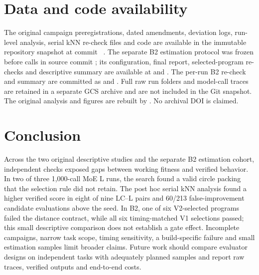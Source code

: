 \documentclass[11pt]{article}
\begin{document}
\section{Data and code availability}\label{sec:availability}

The original campaign preregistrations, dated amendments, deviation logs, run-level analysis, serial kNN re-check files and code are available in the immutable repository snapshot at commit ~\citep{pylypenko2026artifacts}. The separate B2 estimation protocol was frozen before calls in source commit ; its configuration, final report, selected-program re-checks and descriptive summary are available at  and . The per-run B2 re-check and summary are committed as  and . Full raw run folders and model-call traces are retained in a separate GCS archive and are not included in the Git snapshot. The original analysis and figures are rebuilt by . No archival DOI is claimed.

\section{Conclusion}\label{sec:conclusion}

Across the two original descriptive studies and the separate B2 estimation cohort, independent checks exposed gaps between working fitness and verified behavior. In two of three 1,000-call MoE L runs, the search found a valid circle packing that the selection rule did not retain. The post hoc serial kNN analysis found a higher verified score in eight of nine LC--L pairs and 60/213 false-improvement candidate evaluations above the seed. In B2, one of six V2-selected programs failed the distance contract, while all six timing-matched V1 selections passed; this small descriptive comparison does not establish a gate effect. Incomplete campaigns, narrow task scope, timing sensitivity, a build-specific failure and small estimation samples limit broader claims. Future work should compare evaluator designs on independent tasks with adequately planned samples and report raw traces, verified outputs and end-to-end costs.
\end{document}

